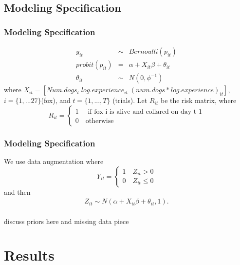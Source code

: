 \documentclass{beamer}
\begin{document}
\subsection{Modeling Specification}
\begin{frame}
	\frametitle{Modeling Specification}
\begin{eqnarray}
y_{it} &\sim& Bernoulli(p_{it}) \\
probit(p_{it}) & = & \alpha + X_{it}\beta+ \theta_{it} \\
\theta_{it} &\sim& N(0, \phi^{-1})
\end{eqnarray}
where $X_{it} = [Num.dogs_t\; log.experience_{it}\; (num.dogs*log.experience)_{it}],$ $i = \{1,...27\} $(fox), and $t= \{1,...,T\}$ (trials). Let $R_{it}$ be the risk matrix, where
\[
    R_{it}=\left\{
                \begin{array}{ll}
                  1 \quad \text{ if fox i is alive and collared on day t-1}\\
                  0 \quad \text{otherwise}
                \end{array}
              \right.
  \]
 \end{frame}
\begin{frame}
	\frametitle{Modeling Specification}
	 We use data augmentation where 
	 \[
    Y_{it}=\left\{
                \begin{array}{ll}
                  1 \quad  Z_{it} > 0\\
                  0 \quad Z_{it} \leq 0
                \end{array}
              \right.
  \]
and then
  \begin{eqnarray}
  Z_{it} \sim N( \alpha + X_{it}\beta +\theta_{it},1).
  \end{eqnarray}
\\
	discuss priors here and missing data piece
\end{frame}
\section{Results}
\end{document}
